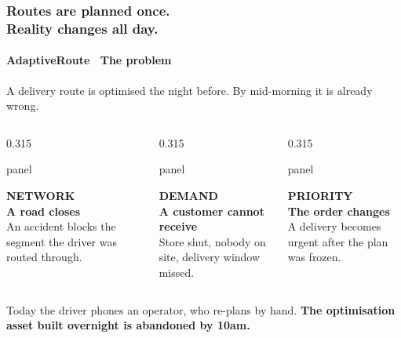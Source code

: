 \documentclass[aspectratio=169,10pt]{beamer}
\newcommand{\muted}[1]{{\color{arMuted} #1}}
\newcommand{\plabel}[1]{{\color{arCyan2}\fontsize{6.4}{7.6}\selectfont\bfseries\MakeUppercase{#1}}}
\newcommand{\ptitle}[1]{{\color{arText}\large\bfseries #1}}
\newenvironment{panel}[1]{%
  \begin{beamercolorbox}[wd=#1,rounded=true,shadow=false,sep=7pt]{panel}%
}{%
  \end{beamercolorbox}%
}
\begin{document}
\begin{frame}
  \frametitle{Routes are planned once.\\ Reality changes all day.}
  \framesubtitle{AdaptiveRoute \textperiodcentered\ The problem}

  \vspace{0.2em}
  \muted{A delivery route is optimised the night before. By mid-morning it is already wrong.}

  \vspace{1.0em}
  \begin{columns}[T]
    \begin{column}{0.315\linewidth}
      \begin{panel}{\linewidth}
        \plabel{Network}\\[0.5em]
        \ptitle{A road closes}\\[0.45em]
        \muted{\small An accident blocks the segment the driver was routed through.}
      \end{panel}
    \end{column}
    \begin{column}{0.315\linewidth}
      \begin{panel}{\linewidth}
        \plabel{Demand}\\[0.5em]
        \ptitle{A customer cannot receive}\\[0.45em]
        \muted{\small Store shut, nobody on site, delivery window missed.}
      \end{panel}
    \end{column}
    \begin{column}{0.315\linewidth}
      \begin{panel}{\linewidth}
        \plabel{Priority}\\[0.5em]
        \ptitle{The order changes}\\[0.45em]
        \muted{\small A delivery becomes urgent after the plan was frozen.}
      \end{panel}
    \end{column}
  \end{columns}

  \vspace{0.9em}
  \centering
  \small Today the driver phones an operator, who re-plans by hand.
  \textbf{The optimisation asset built overnight is abandoned by 10am.}
\end{frame}
\end{document}
